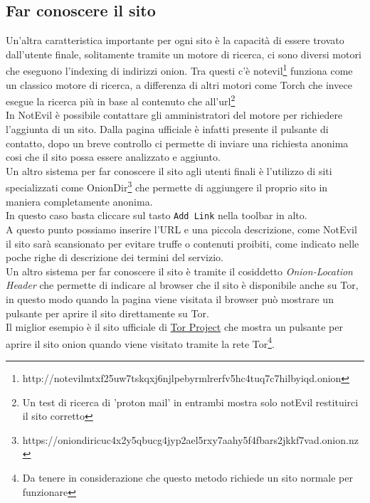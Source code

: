 \subsection{Far conoscere il sito}
Un'altra caratteristica importante per ogni sito è la capacità di essere trovato dall'utente finale, solitamente tramite un motore di ricerca, ci sono diversi motori che eseguono l'indexing di indirizzi onion. Tra questi c'è notevil\footnote{http://notevilmtxf25uw7tskqxj6njlpebyrmlrerfv5hc4tuq7c7hilbyiqd.onion} funziona come un classico motore di ricerca, a differenza di altri motori come Torch che invece esegue la ricerca più in base al contenuto che all'url\footnote{Un test di ricerca di 'proton mail' in entrambi mostra solo notEvil restituirci il sito corretto} \\
In NotEvil è possibile contattare gli amministratori del motore per richiedere l'aggiunta di un sito. 
Dalla pagina ufficiale è infatti presente il pulsante di contatto, dopo un breve controllo ci permette di inviare una richiesta anonima cosi che il sito possa essere analizzato e aggiunto. \\
Un altro sistema per far conoscere il sito agli utenti finali è l'utilizzo di siti specializzati come OnionDir\footnote{https://oniondiricuc4x2y5qbucg4jyp2ael5rxy7aahy5f4fbars2jkkf7vad.onion.nz} che permette di aggiungere il proprio sito in maniera completamente anonima. \\
In questo caso basta cliccare sul tasto \lstinline{Add Link} nella toolbar in alto. \\
A questo punto possiamo inserire l'URL e una piccola descrizione, come NotEvil il sito sarà scansionato per evitare truffe o contenuti proibiti, come indicato nelle poche righe di descrizione dei termini del servizio. \\
\newpage
Un altro sistema per far conoscere il sito è tramite il cosiddetto \emph{Onion-Location Header} che permette di indicare al browser che il sito è disponibile anche su Tor, in questo modo quando la pagina viene visitata il browser può mostrare un pulsante per aprire il sito direttamente su Tor. \\
Il miglior esempio è il sito ufficiale di \href{www.torproject.org}{Tor Project} che mostra un pulsante per aprire il sito onion quando viene visitato tramite la rete Tor\footnote{Da tenere in considerazione che questo metodo richiede un sito normale per funzionare}. \\
